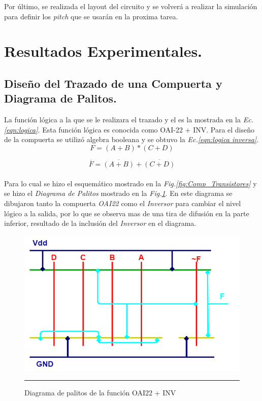 \documentclass[12pt,a4paper]{article} %
\begin{document}
Por último, se realizada el layout del circuito y se volverá a realizar la simulación para definir los \textit{pitch} que se usarán en la proxima tarea.\\

\section{Resultados Experimentales.}


\subsection{Diseño del Trazado de una Compuerta y Diagrama de Palitos.}


La función lógica a la que se le realizara el trazado y el  es la mostrada en la \textit{Ec.\ref{eqn:logica}}. Esta función lógica es conocida como OAI-22 + INV. Para el diseño de la compuerta se utilizó algebra booleana y se obtuvo la \textit{Ec.\ref{eqn:logica inversa}}.\\

\begin{equation}\label{eqn:logica}
F=(A+B)*(C+D)
\end{equation}

\begin{equation}\label{eqn:logica inversa}
\overline{F}=\overline{(A+B)}+\overline{(C+D)}
\end{equation}\\


Para lo cual se hizo el esquemático mostrado en la \textit{Fig.\ref{fig:Comp_Transistores}} y se hizo el \textit{Diagrama de Palitos} mostrado en la \textit{Fig.\ref{fig:inv_est}}. En este diagrama se dibujaron tanto la compuerta \textit{OAI22} como el \textit{Inversor} para cambiar el nivel lógico a la salida, por lo que se observa mas de una tira de difusión en la parte inferior, resultado de la inclusión del \textit{Inversor} en el diagrama.\\

\begin{figure}[htbp]
  \centering
    \includegraphics[scale=0.4]{./Palitos.png}
    \rule{35em}{0.5pt}
  \caption[IdealvsSim]{Diagrama de palitos de la función OAI22 + INV}
  \label{fig:inv_est}
\end{figure}
\end{document}
